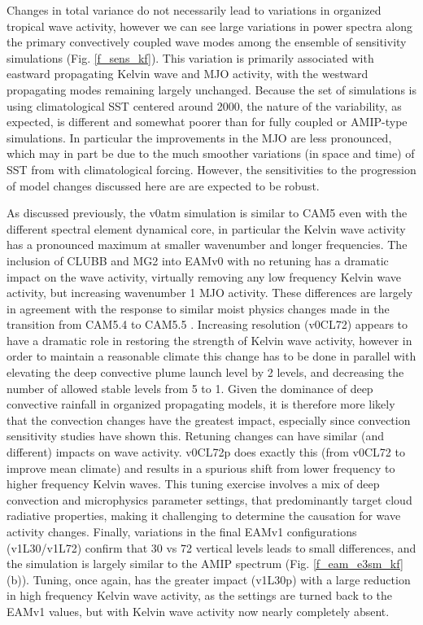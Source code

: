 \documentclass[draft,ms]{AGUTeX}
\begin{document}
\begin{article}
Changes in total variance do not necessarily lead to variations in organized tropical wave activity, however we can see large variations in power spectra along the primary convectively coupled wave modes among the ensemble of sensitivity simulations (Fig. \ref{f_sens_kf}). This variation is primarily associated with eastward propagating Kelvin wave and MJO activity, with the westward propagating modes remaining largely unchanged. Because the set of simulations is using climatological SST centered around 2000, the nature of the variability, as expected, is different and somewhat poorer than for fully coupled or AMIP-type simulations. In particular the improvements in the MJO are less pronounced, which may in part be due to the much smoother variations (in space and time) of SST from with climatological forcing. However, the sensitivities to the progression of model changes discussed here are are expected to be robust.

As discussed previously, the v0atm simulation is similar to CAM5 even with the different spectral element dynamical core, in particular the Kelvin wave activity has a pronounced maximum at smaller wavenumber and longer frequencies. The inclusion of CLUBB and MG2 into EAMv0 with no retuning has a dramatic impact on the wave activity, virtually removing any low frequency Kelvin wave activity, but increasing wavenumber 1 MJO activity. These differences are largely in agreement with the response to similar moist physics changes made in the transition from CAM5.4 to CAM5.5 \citep{Bogenschutz2018}. Increasing resolution (v0CL72) appears to have a dramatic role in restoring the strength of Kelvin wave activity, however in order to maintain a reasonable climate this change has to be done in parallel with elevating the deep convective plume launch level by 2 levels, and decreasing the number of allowed stable levels from 5 to 1. Given the dominance of deep convective rainfall in organized propagating models, it is therefore more likely that the convection changes have the greatest impact, especially since convection sensitivity studies \citep[e.g.,][]{Kim2011} have shown this. Retuning changes can have similar (and different) impacts on wave activity. v0CL72p does exactly this (from v0CL72 to improve mean climate) and results in a spurious shift from lower frequency to higher frequency Kelvin waves. This tuning exercise involves a mix of deep convection and microphysics parameter settings, that predominantly target cloud radiative properties, making it challenging to determine the causation for wave activity changes. Finally, variations in the final EAMv1 configurations (v1L30/v1L72) confirm that 30 vs 72 vertical levels leads to small differences, and the simulation is largely similar to the AMIP spectrum (Fig. \ref{f_eam_e3sm_kf} (b)). Tuning, once again, has the greater impact (v1L30p) with a large reduction in high frequency Kelvin wave activity, as the settings are turned back to the EAMv1 values, but with Kelvin wave activity now nearly completely absent.


\end{article}
\end{document}

